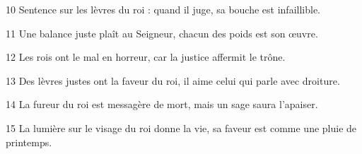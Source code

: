 
10 Sentence sur les lèvres du roi : quand il juge, sa bouche est infaillible.

11 Une balance juste plaît au Seigneur, chacun des poids est son œuvre.

12 Les rois ont le mal en horreur, car la justice affermit le trône.

13 Des lèvres justes ont la faveur du roi, il aime celui qui parle avec droiture.

14 La fureur du roi est messagère de mort, mais un sage saura l’apaiser.

15 La lumière sur le visage du roi donne la vie, sa faveur est comme une pluie de printemps.